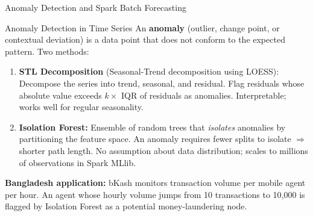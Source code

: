 \documentclass[aspectratio=169,10pt]{beamer}
\begin{document}
\begin{frame}{Anomaly Detection and Spark Batch Forecasting}
   
      \begin{block}{Anomaly Detection in Time Series}
        An \textbf{anomaly} (outlier, change point, or contextual deviation) is a data point that does not conform to the expected pattern.  Two methods:
        \vspace{4pt}
        \begin{enumerate}
          \item \textbf{STL Decomposition} (Seasonal-Trend decomposition using LOESS):  Decompose the series into trend, seasonal, and residual.  Flag residuals whose absolute value exceeds $k \times$ IQR of residuals as anomalies.  Interpretable; works well for regular seasonality.
          \vspace{2pt}
          \item \textbf{Isolation Forest:}  Ensemble of random trees that \textit{isolates} anomalies by partitioning the feature space.  An anomaly requires fewer splits to isolate $\Rightarrow$ shorter path length.  No assumption about data distribution; scales to millions of observations in Spark MLlib.
        \end{enumerate}
        \vspace{4pt}
        \textbf{Bangladesh application:} bKash monitors transaction volume per mobile agent per hour.  An agent whose hourly volume jumps from 10 transactions to 10{,}000 is flagged by Isolation Forest as a potential money-laundering node.
      \end{block}

  
\end{frame}
\end{document}
